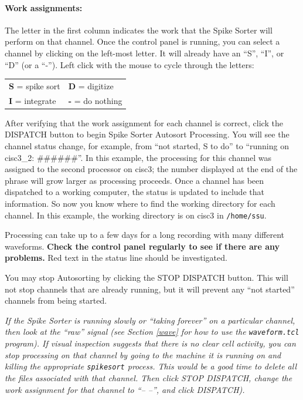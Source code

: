 \documentclass[12pt]{article}
\begin{document}
\paragraph{Work assignments:} The letter in the first column
indicates the work that the Spike Sorter will perform on that channel.
Once the control panel is running, you can select a channel by
clicking on the left-most letter. It will already have an ``S'',
``I'', or ``D'' (or a ``-''). Left click with the mouse to cycle
through the letters:

{\centering
\begin{tabular}{ll}
\textbf{S }= spike sort & \textbf{D }= digitize \\
\textbf{I }= integrate &  \textbf{-} = do nothing\\
\end{tabular}\par}
After verifying that the work assignment for each channel is correct,
click the {\sf DISPATCH} button to begin Spike Sorter Autosort
Processing. You will see the channel status change, for example, from
``not started, S to do'' to ``running on cisc3\_2: \#\#\#\#\#\#''. In
this example, the processing for this channel was assigned to the
second processor on cisc3; the number displayed at the end of the
phrase will grow larger as processing proceeds. Once a channel has
been dispatched to a working computer, the status is updated to
include that information. So now you know where to find the working
directory for each channel. In this example, the working directory is
on cisc3 in {\tt /home/ssu}.

Processing can take up to a few days for a long recording with many
different waveforms. \textbf{Check the control panel regularly to see
  if there are any problems.} Red text in the status line should be
investigated.

You may stop Autosorting by clicking the {\sf STOP DISPATCH} button.
This will not stop channels that are already running, but it will
prevent any ``not started'' channels from being started.

{\em If the Spike Sorter is running slowly or ``taking forever'' on a
  particular channel, then look at the ``raw'' signal (see Section
  \ref{wave} for how to use the {\tt waveform.tcl} program). If visual
  inspection suggests that there is no clear cell activity, you can
  stop processing on that channel by going to the machine it is
  running on and killing the appropriate {\tt spikesort} process. This
  would be a good time to delete all the files associated with that
  channel.  Then click {\sf STOP DISPATCH}, change the work assignment
  for that channel to ``-- --'', and click {\sf DISPATCH}).}
\end{document}
